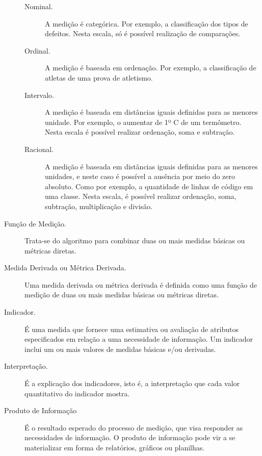 \begin{description}
		\begin{description}
		 	\item [Nominal.] A medição é categórica. Por exemplo, a 
			classificação dos tipos de defeitos. Nesta escala, só é possível 
			realização de comparações.
			\item [Ordinal.] A medição é baseada em ordenação. Por exemplo, a 
			classificação de atletas de uma prova de atletismo.
		 	\item [Intervalo.] A medição é baseada em distâncias iguais 
			definidas para as menores unidade. Por exemplo, o aumentar de 1º C 
			de um termômetro. Nesta escala é possível realizar ordenação, soma 
			e subtração.
		 	\item [Racional.] A medição é baseada em distâncias iguais definidas 
			para as menores unidades, e neste caso é possível a ausência por 
			meio do zero absoluto. Como por exemplo, a quantidade de linhas de 
			código em uma classe. Nesta escala, é possível realizar ordenação, 
			soma, subtração, multiplicação e divisão.

		\end{description}
	 \item [Função de Medição.] Trata-se do algoritmo para combinar duas ou mais 
	 medidas básicas ou métricas diretas.
	 \item [Medida Derivada ou Métrica Derivada.] Uma medida derivada ou métrica 
	 derivada é definida como uma função de medição de duas ou mais medidas 
	 básicas ou métricas diretas.
	
	 \item [Indicador.]  É uma medida que fornece uma estimativa ou avaliação de 
	 atributos especificados em relação a uma necessidade de informação. 
	 Um indicador inclui um ou mais valores de medidas básicas e/ou derivadas.

	\item [Interpretação.]  É a explicação dos indicadores, isto é, a 
	interpretação que cada valor quantitativo do indicador mostra.
	
	\item [Produto de Informação] É o resultado esperado do processo de medição, 
	que visa responder as necessidades de informação. O produto de informação 
	pode vir a se materializar em forma de relatórios, gráficos ou planilhas.
\end{description}






